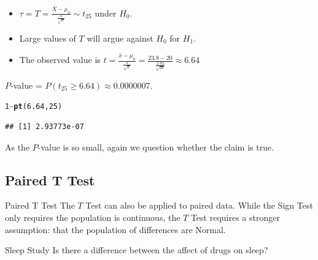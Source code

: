 \documentclass[t,xcolor=pdftex,dvipsnames,table]{beamer}\usepackage[]{graphicx}\usepackage[]{color}
\makeatletter
\newcommand{\hlnum}[1]{\textcolor[rgb]{0.686,0.059,0.569}{#1}}%
\newcommand{\hlopt}[1]{\textcolor[rgb]{0,0,0}{#1}}%
\newcommand{\hlstd}[1]{\textcolor[rgb]{0.345,0.345,0.345}{#1}}%
\newcommand{\hlkwd}[1]{\textcolor[rgb]{0.737,0.353,0.396}{\textbf{#1}}}%
\newenvironment{kframe}{%
 \def\at@end@of@kframe{}%
 \ifinner\ifhmode%
  \def\at@end@of@kframe{\end{minipage}}%
  \begin{minipage}{\columnwidth}%
 \fi\fi%
 \def\FrameCommand##1{\hskip\@totalleftmargin \hskip-\fboxsep
 \colorbox{shadecolor}{##1}\hskip-\fboxsep
     \hskip-\linewidth \hskip-\@totalleftmargin \hskip\columnwidth}%
 \MakeFramed {\advance\hsize-\width
   \@totalleftmargin\z@ \linewidth\hsize
   \@setminipage}}%
 {\par\unskip\endMakeFramed%
 \at@end@of@kframe}
\newenvironment{knitrout}{}{} %
\makeatother
\begin{document}
\begin{frame}[fragile]{}

\begin{itemize}
\item $\tau = T = \frac{\bar{X} - \mu_{0}}{\frac{s}{\sqrt{n}}}  \sim t_{25}$ under $H_{0}$. 
\item Large values of $T$ will argue against $H_{0}$ for $H_{1}$. 
\item The observed value is $t=  \frac{\bar{x} - \mu_{0}}{\frac{s}{\sqrt{n}}} = \frac{23.8 - 20}{\frac{2.92}{\sqrt{26}}} \approx 6.64$
\end{itemize}

 $P$-value = $P( t_{25} \geq 6.64) \approx  0.0000007$.

\begin{knitrout}
\color{fgcolor}\begin{kframe}
\begin{alltt}
\hlnum{1}\hlopt{-}\hlkwd{pt}\hlstd{(}\hlnum{6.64}\hlstd{,}\hlnum{25}\hlstd{)}
\end{alltt}
\begin{verbatim}
## [1] 2.93773e-07
\end{verbatim}
\end{kframe}
\end{knitrout}

\vspace{.5cm}
 As the $P$-value is so small, again we question whether the claim is true.

\end{frame} 


\subsection[Paired T Test]{Paired T Test}
\begin{frame}[fragile]{Paired T Test}
The $T$ Test can also be applied to paired data. While the Sign Test only requires the population is continuous, the $T$ Test requires a stronger assumption: that the population of differences are Normal.

\vspace{.5cm}
\begin{block}{Sleep Study}
Is there a difference between the affect of drugs on sleep?
\end{block}
\end{frame}
\end{document}
